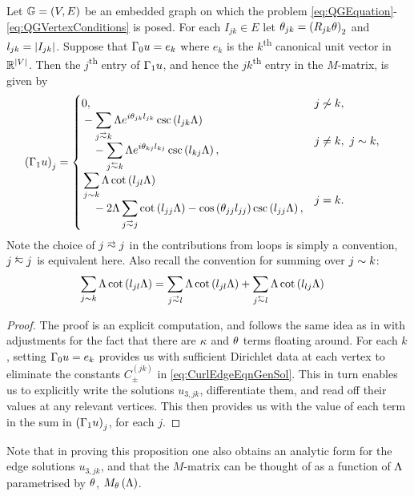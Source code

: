 \begin{prop} \label{prop:M-MatrixEntries}
	Let $\mathbb{G}=\left( V,E \right)$ be an embedded graph on which the problem \eqref{eq:QGEquation}-\eqref{eq:QGVertexConditions} is posed.
	For each $I_{jk}\in E$ let $\theta_{jk} = \left( R_{jk}\theta \right)_2$ and $l_{jk} = \left\lvert I_{jk} \right\rvert$.
	Suppose that $\Gamma_0 u = e_k$ where $e_k$ is the $k$\textsuperscript{th} canonical unit vector in $\mathbb{R}^{\left\lvert V \right\rvert}$.
	Then the $j$\textsuperscript{th} entry of $\Gamma_1 u$, and hence the $jk$\textsuperscript{th} entry in the $M$-matrix, is given by
	\begin{align*}
		\bracs{\nmap u}_j &= 
		\begin{cases}
			\!\begin{aligned}
				&0,
			\end{aligned}			
			& j \not\con k, \\
			\!\begin{aligned}
				&-\sum_{j\conLeft k} \effFreq e^{i\qm_{jk}l_{jk}} \csc\bracs{l_{jk}\effFreq} 
				\\ &\quad - \sum_{j\conRight k} \effFreq e^{i\qm_{kj}l_{kj}} \csc\bracs{l_{kj}\effFreq},
			\end{aligned}
			& j\neq k, \ j\con k, \\
			\!\begin{aligned}
				&\sum_{j\con k} \effFreq\cot\bracs{l_{jl}\effFreq}
				\\ &\quad - 2\effFreq\sum_{j\conLeft j} \cot\bracs{l_{jj}\effFreq} - \cos\bracs{\qm_{jj}l_{jj}}\csc\bracs{l_{jj}\effFreq},
			\end{aligned}
			& j=k.
		\end{cases}
	\end{align*}
	Note the choice of $j\conLeft j$ in the contributions from loops is simply a convention, $j\conRight j$ is equivalent here.
	Also recall the convention for summing over $j\sim k$:
	\begin{align*}
		\sum_{j\con k} \effFreq\cot\bracs{l_{jl}\effFreq} &= \sum_{j\conLeft l} \effFreq\cot\bracs{l_{jl}\effFreq}	+ \sum_{j\conRight l} \effFreq\cot\bracs{l_{lj}\effFreq}
	\end{align*}
\end{prop}
\begin{proof}
	The proof is an explicit computation, and follows the same idea as in  with adjustments for the fact that there are $\kappa$ and $\theta$ terms floating around.
	For each $k$, setting $\Gamma_0 u = e_k$ provides us with sufficient Dirichlet data at each vertex to eliminate the constants $C^{(jk)}_{\pm}$ in \eqref{eq:CurlEdgeEqnGenSol}.
	This in turn enables us to explicitly write the solutions $u_{3,jk}$, differentiate them, and read off their values at any relevant vertices.
	This then provides us with the value of each term in the sum in $\left( \Gamma_1 u \right)_j$, for each $j$.
\end{proof}
Note that in proving this proposition one also obtains an analytic form for the edge solutions $u_{3,jk}$, and that the $M$-matrix can be thought of as a function of $\Lambda$ parametrised by $\theta$, $M_{\theta}\left( \Lambda \right)$.

